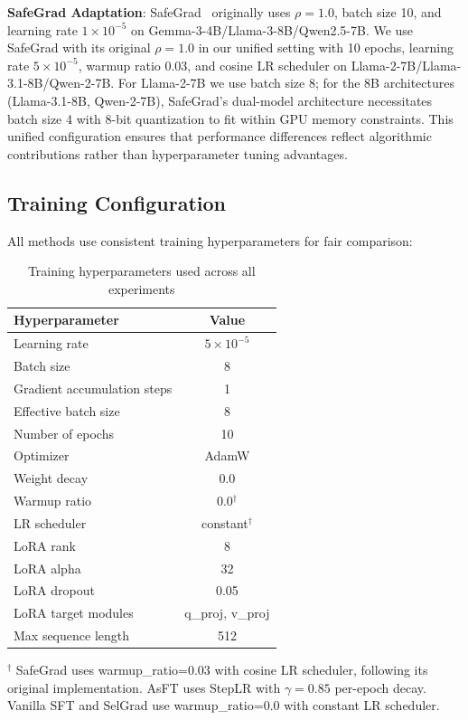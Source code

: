 \textbf{SafeGrad Adaptation}: SafeGrad~\cite{yi2025safegrad} originally uses $\rho=1.0$, batch size 10, and learning rate $1\times10^{-5}$ on Gemma-3-4B/Llama-3-8B/Qwen2.5-7B. We use SafeGrad with its original $\rho=1.0$ in our unified setting with 10 epochs, learning rate $5\times10^{-5}$, warmup ratio 0.03, and cosine LR scheduler on Llama-2-7B/Llama-3.1-8B/Qwen-2-7B. For Llama-2-7B we use batch size 8; for the 8B architectures (Llama-3.1-8B, Qwen-2-7B), SafeGrad's dual-model architecture necessitates batch size 4 with 8-bit quantization to fit within GPU memory constraints. This unified configuration ensures that performance differences reflect algorithmic contributions rather than hyperparameter tuning advantages.

\subsection{Training Configuration}
\label{subsec:training_config}

All methods use consistent training hyperparameters for fair comparison:

\begin{table}[htbp]
\centering
\small
\caption{Training hyperparameters used across all experiments}
\label{tab:training_config}
\begin{tabular}{lc}
\toprule
\textbf{Hyperparameter} & \textbf{Value} \\
\midrule
Learning rate & $5 \times 10^{-5}$ \\
Batch size & 8 \\
Gradient accumulation steps & 1 \\
Effective batch size & 8 \\
Number of epochs & 10 \\
Optimizer & AdamW \\
Weight decay & 0.0 \\
Warmup ratio & 0.0$^\dagger$ \\
LR scheduler & constant$^\dagger$ \\
LoRA rank & 8 \\
LoRA alpha & 32 \\
LoRA dropout & 0.05 \\
LoRA target modules & q\_proj, v\_proj \\
Max sequence length & 512 \\
\bottomrule
\end{tabular}

\vspace{0.3em}
\noindent$^\dagger$ SafeGrad uses warmup\_ratio=0.03 with cosine LR scheduler, following its original implementation. AsFT uses StepLR with $\gamma=0.85$ per-epoch decay. Vanilla SFT and SelGrad use warmup\_ratio=0.0 with constant LR scheduler.
\end{table}

